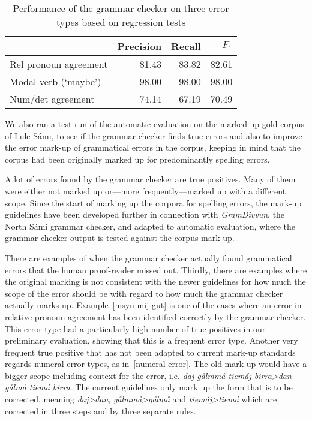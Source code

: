 \documentclass[free]{flammie}
\begin{document}
\begin{table}[htb]
    \centering \small
    \begin{tabular}{lrrr}
    \toprule
        \bf & \bf  Precision & \bf Recall & \bf $F_1$ \\
        \midrule
        Rel pronoun agreement & 81.43 & 83.82 & 82.61 \\
        Modal verb (`maybe') & 98.00 & 98.00 & 98.00 \\

        Num/det agreement & 74.14 & 67.19 & 70.49 \\

        \bottomrule
    \end{tabular}
    \caption{Performance  of the  grammar checker on three error types based on
    regression tests\label{evaluation}}
\end{table}












We also ran a test run of the automatic evaluation on the marked-up gold corpus
of Lule Sámi, to see if the grammar checker finds true errors and also to
improve the error mark-up of grammatical errors in the corpus, keeping in mind
that the corpus had been originally marked up for predominantly spelling errors.

A lot of errors found by the grammar checker are true positives. Many of them
were either not marked up or---more frequently---marked up with a different
scope. Since the start of marking up the corpora for spelling errors, the
mark-up guidelines have been developed further in connection with
\textit{GramDivvun}, the North Sámi grammar checker, and adapted to automatic
evaluation, where the grammar checker output is tested against the corpus
mark-up.

There are examples of when the grammar checker actually found grammatical errors
that the human proof-reader missed out.  Thirdly, there are examples where the
original marking is not consistent with the newer guidelines for how much the
scope of the error should be with regard to how much the grammar checker
actually marks up.  Example~\ref{msyn-mij-gut} is one of the cases where an
error in relative pronoun agreement has been identified correctly by the grammar
checker. This error type had a particularly high number of true positives in our
preliminary evaluation, showing that this is a frequent error type. Another very
frequent true positive that has not been adapted to current mark-up standards
regards numeral error types, as in~\ref{numeral-error}. The old mark-up would
have a bigger scope including context for the error, i.e. \textit{daj gålmmå
tiemáj birra>dan gålmå tiemá birra}. The current guidelines only mark up the
form that is to be corrected, meaning \textit{daj>dan}, \textit{gålmmå>gålmå}
and \textit{tiemáj>tiemá}  which are corrected in three steps and by three
separate rules.
\end{document}

